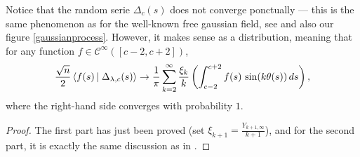 \documentclass[10pt]{amsart}
\begin{document}
Notice that the random serie $\Delta_{c}(s)$ does not converge ponctually --- this is the same phenomenon as for the well-known free gaussian field, see \cite{She07} and also our figure \ref{gaussianprocess}. However, it makes sense as a distribution, meaning that for any function $f \in \mathscr{C}^{\infty}([c-2,c+2])$, $$\frac{\sqrt{n}}{2}\scal{f(s)}{\Delta_{\lambda,c}(s)} \to \frac{1}{\pi}\sum_{k=2}^{\infty} \frac{\xi_{k}}{k} \left(\int_{c-2}^{c+2} f(s)\,\sin(k\theta(s))\,ds\right),$$
where the right-hand side converges with probability $1$.

\begin{proof}
The first part has just been proved (set $\xi_{k+1}=\frac{Y_{k+1,\infty}}{k+1}$), and for the second part, it is exactly the same discussion as in \cite[\S9]{IO02}.
\end{proof}
\bigskip



\end{document}
